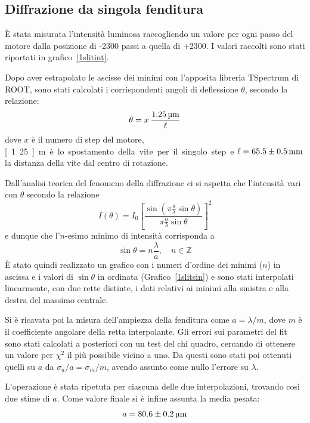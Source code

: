 \documentclass[italian,a4paper]{article}
\newcommand{\Z}{\mathbb{Z}}
\begin{document}
\subsection*{Diffrazione da singola fenditura}
\`{E} stata misurata l'intensità luminosa raccogliendo un valore per ogni passo del motore dalla posizione di -2300 passi a quella di +2300. I valori raccolti sono stati riportati in grafico~\ref{1slitint}.

Dopo aver estrapolato le ascisse dei minimi con l'apposita libreria TSpectrum di ROOT, sono stati calcolati i corrispondenti angoli di deflessione $\theta$, secondo la relazione:
\begin{equation*}
\theta = x \:\dfrac{\unit[1.25]{\micro m}}{\ell}
\end{equation*}
dove $x$ è il numero di step del motore, \unit[1.25]{\micro m} è lo spostamento della vite per il singolo step e $\ell=\unit[65.5 \pm 0.5]{mm}$ la distanza della vite dal centro di rotazione.

Dall'analisi teorica del fenomeno della diffrazione ci si aspetta che l'intensità vari con $\theta$ secondo la relazione
\begin{equation*}
I(\theta)=I_0\left[\dfrac{\sin{\left(\pi\frac{a}{\lambda}\sin\theta\right)}}{\pi\frac{a}{\lambda}\sin\theta}\right]^2
\end{equation*}
e dunque che l'$n$-esimo minimo di intensità corrisponda a
\begin{equation*}
\sin{\theta} = n\dfrac{\lambda}{a},\quad n \in \Z
\end{equation*}
\`{E} stato quindi realizzato un grafico con i numeri d'ordine dei minimi ($n$) in ascissa e i valori di $\sin\theta$ in ordinata (Grafico~\ref{1slitsin}) e sono stati interpolati linearmente, con due rette distinte, i dati relativi ai minimi alla sinistra e alla destra del massimo centrale.

Si è ricavata poi la misura dell'ampiezza della fenditura come $a = \lambda/m$, dove $m$ è il coefficiente angolare della retta interpolante. Gli errori sui parametri del fit sono stati calcolati a posteriori con un test del chi quadro, cercando di ottenere un valore per $\chi^2$ il più possibile vicino a uno. Da questi sono stati poi ottenuti quelli su $a$ da $\sigma_a/a=\sigma_m/m$, avendo assunto come nullo l'errore su $\lambda$.

L'operazione è stata ripetuta per ciascuna delle due interpolazioni, trovando così due stime di $a$. Come valore finale si è infine assunta la media pesata:
\begin{equation*}
a=\unit[80.6 \pm 0.2]{\micro m}
\end{equation*}
\end{document}
